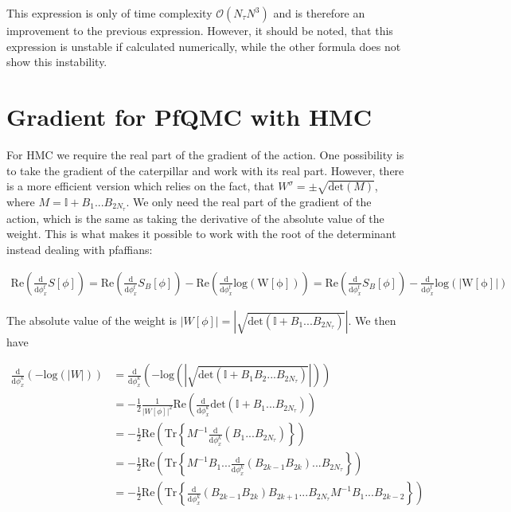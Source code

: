\documentclass{article}
\begin{document}
This expression is only of time complexity $\mathcal{O}\left(N_\tau N^3\right)$ and is therefore an improvement to the previous expression. However, it should be noted, that this expression is unstable if calculated numerically, while the other formula does not show this instability.

\section{Gradient for PfQMC with HMC}

For HMC we require the real part of the gradient of the action. One possibility is to take the gradient of the caterpillar and work with its real part. However, there is a more efficient version which relies on the fact, that $W^{\sigma}  = \pm \sqrt{\mathrm{det}\left(  M  \right)}$, where $M  = \mathbb{I} + B _1 ... B _{2N_{\tau} }$. We only need the real part of the gradient of the action, which is the same as taking the derivative of the absolute value of the weight. This is what makes it possible to work with the root of the determinant instead dealing with pfaffians:

\begin{align}
	\mathrm{Re} \left(\frac{\mathrm{d} }{\mathrm{d}\phi_{x}^{t} } S[\phi] \right) = \mathrm{Re} \left(\frac{\mathrm{d} }{\mathrm{d}\phi_{x}^{t} }  S_B[\phi] \right) - \mathrm{Re} \left(\frac{\mathrm{d} }{\mathrm{d}\phi_{x}^{t} }\mathrm{log\left(W[\phi]\right) }  \right)  = \mathrm{Re} \left(\frac{\mathrm{d} }{\mathrm{d}\phi_{x}^{t} }  S_B[\phi] \right) - \frac{\mathrm{d} }{\mathrm{d}\phi_{x}^{t} }\mathrm{log\left(|W[\phi]|\right) }   
\end{align}

The absolute value of the weight is $|W[\phi]| = \left|\sqrt{\mathrm{det} \left(\mathbb{I} + B_1 ... B_{2N_\tau} \right) }\right|$. We then have

\begin{align}
	\frac{\mathrm{d} }{\mathrm{d}\phi_{x}^{k} } \left(-\mathrm{log}\left(|W|\right) \right) &= 
	\frac{\mathrm{d} }{\mathrm{d}\phi_{x}^{k} } \left(- \mathrm{log} \left(|\sqrt{\mathrm{det} \left(\mathbb{I} + B_1B_2...B_{2N_\tau} \right) }|\right) \right)\\  
	&= -\frac{1}{2}\frac{1}{|W[\phi]|^{2} }\mathrm{Re}\left(   \frac{\mathrm{d} }{\mathrm{d}\phi_{x}^{k}} \mathrm{det}\left(\mathbb{I} + B_1...B_{2N_\tau}\right)\right) \\
	&= -\frac{1}{2} \mathrm{Re} \left( \mathrm{Tr} \left\{M^{-1}\frac{\mathrm{d} }{\mathrm{d}\phi_{x}^{k}}\left(B_1...B_{2N_\tau}\right)  \right\}\right)\\
	&= -\frac{1}{2}\mathrm{Re} \left(\mathrm{Tr} \left\{M^{-1}B_{1}...\frac{\mathrm{d} }{\mathrm{d}\phi_{x}^{k}}\left(B_{2k-1}B_{2k}\right)...B_{2N_\tau}   \right\} \right)\\
	&=    -\frac{1}{2}\mathrm{Re} \left(\mathrm{Tr} \left\{\frac{\mathrm{d} }{\mathrm{d}\phi_{x}^{k}}\left(B_{2k-1}B_{2k}\right)B_{2k+1} ...B_{2N_\tau}M^{-1}B_{1}...B_{2k-2}    \right\} \right)
\end{align}
\end{document}
